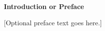 
\begin{center}
\vspace*{5\baselineskip}
\textbf{\large Introduction or Preface}
\end{center}

\begin{flushleft}
\hspace{10mm}[Optional preface text goes here.]
\end{flushleft}
